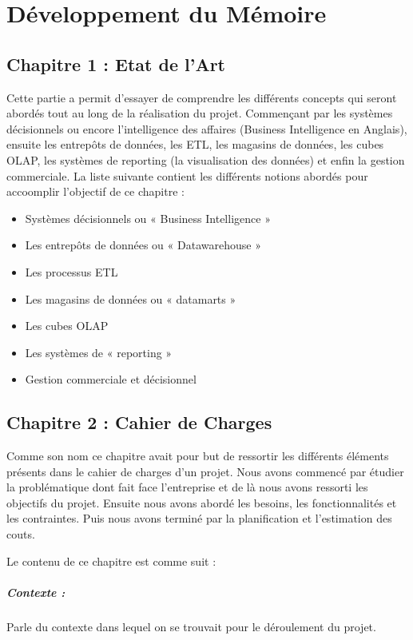 \chapter*{Développement du Mémoire}

\section*{Chapitre 1 : Etat de l'Art}
Cette partie a permit d'essayer de comprendre les différents concepts qui seront abordés tout au long de la réalisation du projet. Commençant par les systèmes décisionnels ou encore l’intelligence des affaires (Business Intelligence en Anglais), ensuite les entrepôts de données, les ETL, les magasins de données, les cubes OLAP, les systèmes de reporting (la visualisation des données) et enfin la gestion commerciale. La liste suivante contient les différents notions abordés pour accoomplir l'objectif de ce chapitre :

\begin{itemize}
    \item Systèmes décisionnels ou « Business Intelligence »
    \item Les entrepôts de données ou « Datawarehouse »
    \item Les processus ETL
    \item Les magasins de données ou « datamarts »
    \item Les cubes OLAP
    \item Les systèmes de « reporting »
    \item Gestion commerciale et décisionnel
\end{itemize}



\section*{Chapitre 2 : Cahier de Charges}
Comme son nom ce chapitre avait pour but de ressortir les différents éléments présents dans le cahier de charges d’un projet. Nous avons commencé par étudier la problématique dont fait face l’entreprise et de là nous avons ressorti les objectifs du projet. Ensuite nous avons abordé les besoins, les fonctionnalités et les contraintes. Puis nous avons terminé par la planification et l'estimation des couts.

Le contenu de ce chapitre est comme suit : 
\paragraph{Contexte :} Parle du contexte dans lequel on se trouvait pour le déroulement du projet.

